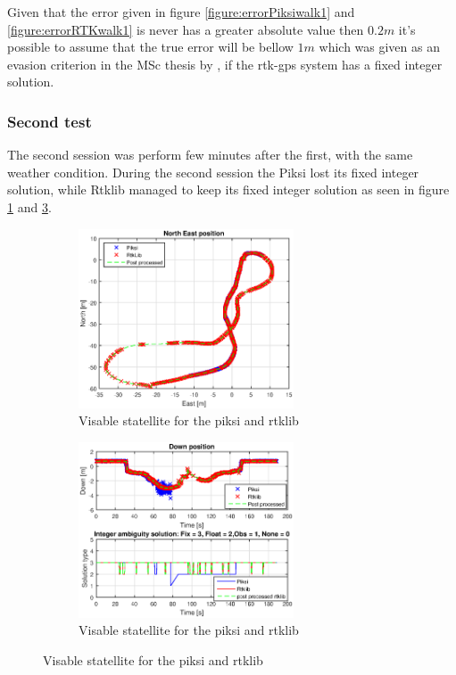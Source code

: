 Given that the error given in figure \ref{figure:errorPiksiwalk1} and \ref{figure:errorRTKwalk1} is never has a greater absolute value then $0.2m$ it's possible to assume that the true error will be bellow $1m$ which was given as an evasion criterion in the MSc thesis by \citep{Froelich}, if the \gls{rtk-gps} system has a fixed integer solution.
\subsubsection{Second test}
The second session was perform few minutes after the first, with the same weather condition.
During the second session the Piksi lost its fixed integer solution, while Rtklib managed to keep its fixed integer solution as seen in figure \ref{figure:xyWalk2} and \ref{figure:downWalk2}.

\begin{figure}[H]
\begin{subfigure}[H]{1\textwidth}
	\centering
		\includegraphics[width=0.7\textwidth]{figs/plots/xywalk2.eps}
		\caption{Visable statellite for the piksi and rtklib}
		\label{figure:xyWalk2}
\end{subfigure}
\begin{subfigure}[H]{1\textwidth}
	\centering
		\includegraphics[width=0.7\textwidth]{figs/plots/downWalk2.eps}
		\caption{Visable statellite for the piksi and rtklib}
		\label{figure:downWalk2}
\end{subfigure}

\end{figure}
